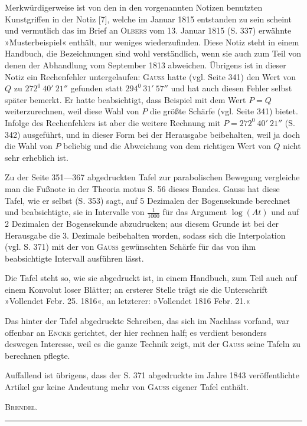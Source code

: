 \par
\noindent\hspace*{\parindent}Merkwürdigerweise ist von den in den vorgenannten Notizen benutzten Kunstgriffen in der Notiz [7], welche im Januar 1815 entstanden zu sein scheint und vermutlich das im Brief an \textsc{Olbers} vom 13. Januar 1815 (S. 337) erwähnte »Musterbeispiel« enthält, nur weniges wiederzufinden. Diese Notiz steht in einem Handbuch, die Bezeichnungen sind wohl verständlich, wenn sie auch zum Teil von denen der Abhandlung vom September 1813 abweichen. Übrigens ist in dieser Notiz ein Rechenfehler untergelaufen: \textsc{Gauss} hatte (vgl. Seite 341) den Wert von \(Q\) zu \(272^0\ 40'\ 21''\) gefunden statt \(294^0\ 31'\ 57''\) und hat auch diesen Fehler selbst später bemerkt. Er hatte beabsichtigt, dass Beispiel mit dem Wert \(P=Q\) weiterzurechnen, weil diese Wahl von \(P\) die größte Schärfe (vgl. Seite 341) bietet. Infolge des Rechenfehlers ist aber die weitere Rechnung mit \(P=272^0\ 40'\ 21''\) (S. 342) ausgeführt, und in dieser Form bei der Herausgabe beibehalten, weil ja doch die Wahl von \(P\) beliebig und die Abweichung von dem richtigen Wert von \(Q\) nicht sehr erheblich ist.
\par
\noindent\hspace*{\parindent}Zu der Seite 351—367 abgedruckten Tafel zur parabolischen Bewegung vergleiche man die Fußnote in der Theoria motus S. 56 dieses Bandes. Gauss hat diese Tafel, wie er selbst (S. 353) sagt, auf 5 Dezimalen der Bogensekunde berechnet und beabsichtigte, sie in Intervalle von \(\frac1{1000}\) für das Argument \(\log(At)\) und auf 2 Dezimalen der Bogensekunde abzudrucken; aus diesem Grunde ist bei der Herausgabe die 3. Dezimale beibehalten worden, sodass sich die Interpolation (vgl. S. 371) mit der von \textsc{Gauss} gewünschten Schärfe für das von ihm beabsichtigte Intervall ausführen lässt.
\par
\noindent\hspace*{\parindent}Die Tafel steht so, wie sie abgedruckt ist, in einem Handbuch, zum Teil auch auf einem Konvolut loser Blätter; an ersterer Stelle trägt sie die Unterschrift »Vollendet Febr. 25. 1816«, an letzterer: »Vollendet 1816 Febr. 21.«
\par
\noindent\hspace*{\parindent}Das hinter der Tafel abgedruckte Schreiben, das sich im Nachlass vorfand, war offenbar an \textsc{Encke} gerichtet, der hier rechnen half; es verdient besonders deswegen Interesse, weil es die ganze Technik zeigt, mit der \textsc{Gauss} seine Tafeln zu berechnen pflegte.
\par
\noindent\hspace*{\parindent}Auffallend ist übrigens, dass der S. 371 abgedruckte im Jahre 1843 veröffentlichte Artikel gar keine Andeutung mehr von \textsc{Gauss} eigener Tafel enthält.
\par\smallskip
\hfill\textsc{Brendel}.
\par\endgroup\bigskip
\begin{center}\rule{.27\linewidth}{.4pt}\end{center}
